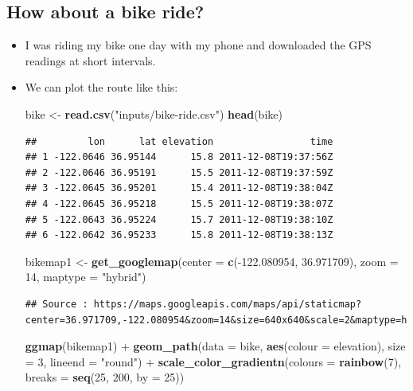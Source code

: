 \documentclass[]{book}
\newenvironment{Shaded}{\begin{snugshade}}{\end{snugshade}}
\newcommand{\KeywordTok}[1]{\textcolor[rgb]{0.13,0.29,0.53}{\textbf{{#1}}}}
\newcommand{\DataTypeTok}[1]{\textcolor[rgb]{0.13,0.29,0.53}{{#1}}}
\newcommand{\DecValTok}[1]{\textcolor[rgb]{0.00,0.00,0.81}{{#1}}}
\newcommand{\FloatTok}[1]{\textcolor[rgb]{0.00,0.00,0.81}{{#1}}}
\newcommand{\StringTok}[1]{\textcolor[rgb]{0.31,0.60,0.02}{{#1}}}
\newcommand{\NormalTok}[1]{{#1}}
\theoremstyle{definition}
\theoremstyle{definition}
\theoremstyle{remark}
\begin{document}
\subsection{How about a bike ride?}\label{how-about-a-bike-ride}

\begin{itemize}
\item
  I was riding my bike one day with my phone and downloaded the GPS
  readings at short intervals.
\item
  We can plot the route like this:

\begin{Shaded}
\begin{Highlighting}[]
\NormalTok{bike <-}\StringTok{ }\KeywordTok{read.csv}\NormalTok{(}\StringTok{"inputs/bike-ride.csv"}\NormalTok{)}
\KeywordTok{head}\NormalTok{(bike)}
\end{Highlighting}
\end{Shaded}

\begin{verbatim}
##         lon      lat elevation                 time
## 1 -122.0646 36.95144      15.8 2011-12-08T19:37:56Z
## 2 -122.0646 36.95191      15.5 2011-12-08T19:37:59Z
## 3 -122.0645 36.95201      15.4 2011-12-08T19:38:04Z
## 4 -122.0645 36.95218      15.5 2011-12-08T19:38:07Z
## 5 -122.0643 36.95224      15.7 2011-12-08T19:38:10Z
## 6 -122.0642 36.95233      15.8 2011-12-08T19:38:13Z
\end{verbatim}

\begin{Shaded}
\begin{Highlighting}[]
\NormalTok{bikemap1 <-}\StringTok{ }\KeywordTok{get_googlemap}\NormalTok{(}\DataTypeTok{center =} \KeywordTok{c}\NormalTok{(-}\FloatTok{122.080954}\NormalTok{, }\FloatTok{36.971709}\NormalTok{), }\DataTypeTok{zoom =} \DecValTok{14}\NormalTok{, }\DataTypeTok{maptype =} \StringTok{"hybrid"}\NormalTok{)}
\end{Highlighting}
\end{Shaded}

\begin{verbatim}
## Source : https://maps.googleapis.com/maps/api/staticmap?center=36.971709,-122.080954&zoom=14&size=640x640&scale=2&maptype=hybrid
\end{verbatim}

\begin{Shaded}
\begin{Highlighting}[]
\KeywordTok{ggmap}\NormalTok{(bikemap1) +}\StringTok{ }
\StringTok{  }\KeywordTok{geom_path}\NormalTok{(}\DataTypeTok{data =} \NormalTok{bike, }\KeywordTok{aes}\NormalTok{(}\DataTypeTok{colour =} \NormalTok{elevation), }\DataTypeTok{size =} \DecValTok{3}\NormalTok{, }\DataTypeTok{lineend =} \StringTok{"round"}\NormalTok{) +}\StringTok{ }
\StringTok{  }\KeywordTok{scale_color_gradientn}\NormalTok{(}\DataTypeTok{colours =} \KeywordTok{rainbow}\NormalTok{(}\DecValTok{7}\NormalTok{), }\DataTypeTok{breaks =} \KeywordTok{seq}\NormalTok{(}\DecValTok{25}\NormalTok{, }\DecValTok{200}\NormalTok{, }\DataTypeTok{by =} \DecValTok{25}\NormalTok{))}
\end{Highlighting}
\end{Shaded}


\end{itemize}
\end{document}
